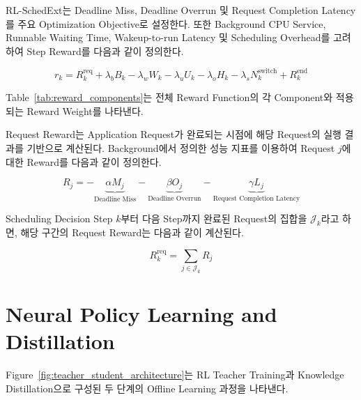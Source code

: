 RL-SchedExt는 Deadline Miss, Deadline Overrun 및
Request Completion Latency를 주요 Optimization Objective로 설정한다.
또한 Background CPU Service, Runnable Waiting Time,
Wakeup-to-run Latency 및 Scheduling Overhead를 고려하여
Step Reward를 다음과 같이 정의한다.

\begin{equation}
    r_k = R_k^{\mathrm{req}} + \lambda_b B_k - \lambda_w W_k - \lambda_u U_k - \lambda_o H_k - \lambda_s N_k^{\mathrm{switch}} + R_k^{\mathrm{end}}
    \label{eq:total_reward}
\end{equation}

Table~\ref{tab:reward_components}는 전체 Reward Function의
각 Component와 적용되는 Reward Weight를 나타낸다.

Request Reward는 Application Request가 완료되는 시점에
해당 Request의 실행 결과를 기반으로 계산된다.
Background에서 정의한 성능 지표를 이용하여
Request $j$에 대한 Reward를 다음과 같이 정의한다.

\begin{equation}
    R_j =
    -\underbrace{\alpha M_j}_{\text{Deadline Miss}}
    -\underbrace{\beta O_j}_{\text{Deadline Overrun}}
    -\underbrace{\gamma L_j}_{\text{Request Completion Latency}}
    \label{eq:request_reward}
\end{equation}

Scheduling Decision Step $k$부터 다음 Step까지
완료된 Request의 집합을 $\mathcal{J}_k$라고 하면,
해당 구간의 Request Reward는 다음과 같이 계산된다.

\begin{equation}
    R_k^{\mathrm{req}}
    =
    \sum_{j\in\mathcal{J}_k}R_j
    \label{eq:request_reward_sum}
\end{equation}

\section{Neural Policy Learning and Distillation}
\label{sec:design-neural-policy-learning-and-distillation}
Figure~\ref{fig:teacher_student_architecture}는 RL Teacher Training과 Knowledge Distillation으로 구성된 두 단계의 Offline Learning 과정을 나타낸다.


